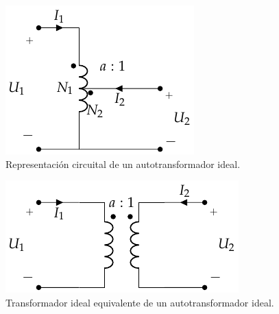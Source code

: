 \begin{figure}
  \centering
  \includegraphics[height=.25\textheight]{../figs/AutoTrafoIdeal.pdf}
  \caption{Representación circuital de un autotransformador ideal.}
  \label{fig:autotrafo-ideal}
\end{figure}
\begin{figure}
  \centering
  \includegraphics[height=.2\textheight]{../figs/Trafo_Ideal.pdf}
  \caption{Transformador ideal equivalente de un autotransformador ideal.}
  \label{fig:autotrafo-ideal-equivalente}
\end{figure}

